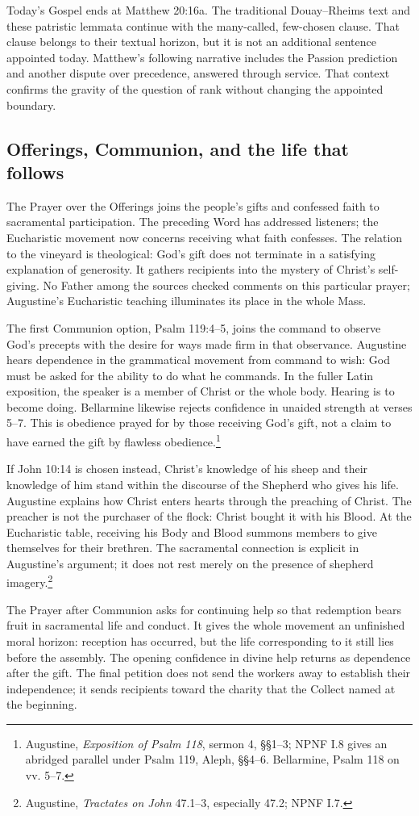 Today's Gospel ends at Matthew 20:16a. The traditional Douay--Rheims text and these patristic lemmata continue with the many-called, few-chosen clause. That clause belongs to their textual horizon, but it is not an additional sentence appointed today. Matthew's following narrative includes the Passion prediction and another dispute over precedence, answered through service. That context confirms the gravity of the question of rank without changing the appointed boundary.

\subsection{Offerings, Communion, and the life that follows}
The Prayer over the Offerings joins the people's gifts and confessed faith to sacramental participation. The preceding Word has addressed listeners; the Eucharistic movement now concerns receiving what faith confesses. The relation to the vineyard is theological: God's gift does not terminate in a satisfying explanation of generosity. It gathers recipients into the mystery of Christ's self-giving. No Father among the sources checked comments on this particular prayer; Augustine's Eucharistic teaching illuminates its place in the whole Mass.

The first Communion option, Psalm 119:4--5, joins the command to observe God's precepts with the desire for ways made firm in that observance. Augustine hears dependence in the grammatical movement from command to wish: God must be asked for the ability to do what he commands. In the fuller Latin exposition, the speaker is a member of Christ or the whole body. Hearing is to become doing. Bellarmine likewise rejects confidence in unaided strength at verses 5--7. This is obedience prayed for by those receiving God's gift, not a claim to have earned the gift by flawless obedience.\footnote{Augustine, \textit{Exposition of Psalm 118}, sermon 4, §§1--3; NPNF I.8 gives an abridged parallel under Psalm 119, Aleph, §§4--6. Bellarmine, Psalm 118 on vv. 5--7.}

If John 10:14 is chosen instead, Christ's knowledge of his sheep and their knowledge of him stand within the discourse of the Shepherd who gives his life. Augustine explains how Christ enters hearts through the preaching of Christ. The preacher is not the purchaser of the flock: Christ bought it with his Blood. At the Eucharistic table, receiving his Body and Blood summons members to give themselves for their brethren. The sacramental connection is explicit in Augustine's argument; it does not rest merely on the presence of shepherd imagery.\footnote{Augustine, \textit{Tractates on John} 47.1--3, especially 47.2; NPNF I.7.}

The Prayer after Communion asks for continuing help so that redemption bears fruit in sacramental life and conduct. It gives the whole movement an unfinished moral horizon: reception has occurred, but the life corresponding to it still lies before the assembly. The opening confidence in divine help returns as dependence after the gift. The final petition does not send the workers away to establish their independence; it sends recipients toward the charity that the Collect named at the beginning.
